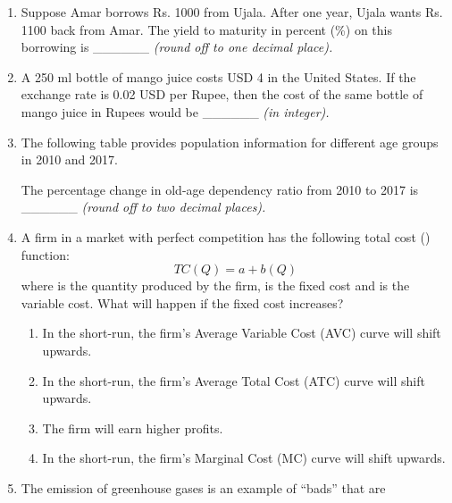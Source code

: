 \documentclass[12pt]{article}
\theoremstyle{remark}
\begin{document}
\begin{enumerate}
\item Suppose Amar borrows Rs. 1000 from Ujala. After one year, Ujala wants Rs. 1100 back from Amar. The yield to maturity in percent (\%) on this borrowing is \_\_\_\_\_\_ \textit{(round off to one decimal place).} 
\hfill{}
\item A 250 ml bottle of mango juice costs USD 4 in the United States. If the exchange rate is 0.02 USD per Rupee, then the cost of the same bottle of mango juice in Rupees would be \_\_\_\_\_\_ \textit{(in integer).} 
\hfill{}
\item The following table provides population information for different age groups in 2010 and 2017. 
\begin{centering}
\begin{table}[H]

\caption{}
\label{Table 1.1}
\end{table}
\end{centering}
The percentage change in old-age dependency ratio from 2010 to 2017 is \_\_\_\_\_\_ \textit{(round off to two decimal places).}
\hfill{}
\item A firm in a market with perfect competition has the following total cost () function:
$$
TC(Q) = a + b(Q)
$$
where  is the quantity produced by the firm,  is the fixed cost and  is the variable cost. What will happen if the fixed cost increases? \\
\begin{enumerate} 
\item   In the short-run, the firm’s Average Variable Cost (AVC) curve will shift upwards. 
\item   In the short-run, the firm’s Average Total Cost (ATC) curve will shift upwards. 
\item   The firm will earn higher profits. 
\item   In the short-run, the firm’s Marginal Cost (MC) curve will shift upwards.
\end{enumerate}
\hfill{}
\item   The emission of greenhouse gases is an example of “bads” that are
\begin{enumerate} 
\end{enumerate}
\end{enumerate}
\end{document}
